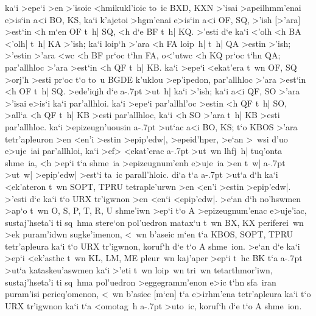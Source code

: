 \begin{Parallel}{}{}
{{ka`i >epe`i >en >'isoic <hmikukl'ioic to~ic BXD, KXN >'isai >apeilhmm'enai e>is`in a<i BO, KS,
ka`i k'ajetoi >hgm'enai e>is`in a<i OF, SQ, >'ish [>'ara] >est`in <h m`en OF t~h| SQ, <h d`e BF
t~h| KQ. >'esti d`e ka`i <'olh <h BA <'olh| t~h| KA >'ish; ka`i loip`h >'ara <h FA loip~h| t~h| QA >estin
>'ish; >'estin >'ara <wc <h BF pr`oc t`hn FA, o<'utwc <h KQ pr`oc t`hn QA; par'allhloc >'ara >est`in <h QF t~h| KB. ka`i
>epe`i <ekat'era t~wn OF, SQ >orj'h >esti pr`oc t`o to~u BGDE k'uklou >ep'ipedon, par'allhloc >'ara >est`in <h OF t~h| SQ. >ede'iqjh
d`e a\kern -.7pt >ut~h| ka`i >'ish; ka`i a<i QF, SO >'ara >'isai e>is`i ka`i par'allhloi. ka`i >epe`i par'allhl'oc >estin <h QF t~h|
SO, >all`a <h QF t~h| KB >esti par'allhloc, ka`i <h SO >'ara t~h| KB >esti par'allhloc. ka`i >epizeugn'uousin
a\kern -.7pt >ut`ac a<i BO, KS; t`o KBOS >'ara tetr'apleuron >en <en'i >estin >epip'edw|, >epeid'hper, >e`an >~wsi d'uo
e>uje~iai par'allhloi, ka`i >ef> <ekat'erac a\kern -.7pt >ut~wn lhfj~h| tuq'onta shme~ia, <h >ep`i t`a shme~ia >epizeugnum'enh
e>uje~ia >en t~w| a\kern -.7pt >ut~w| >epip'edw| >est`i ta~ic parall'hloic. di`a t`a a\kern -.7pt >ut`a d`h ka`i <ek'ateron t~wn SOPT, TPRU
tetraple'urwn >en <en'i >estin >epip'edw|. >'esti d`e ka`i t`o URX tr'igwnon >en <en`i <epip'edw|.
>e`an d`h no'hswmen >ap`o t~wn O, S, P, T, R, U shme'iwn >ep`i t`o A
>epizeugnum'enac e>uje'iac, sustaj'hseta'i ti sq~hma stere`on pol'uedron matax`u t~wn BX, KX periferei~wn >ek puram'idwn
sugke'imenon, <~wn b'aseic m`en t`a KBOS, SOPT, TPRU tetr'apleura ka`i t`o URX tr'igwnon, koruf`h d`e t`o A shme~ion. >e`an
d`e ka`i >ep`i <ek'asthc t~wn KL, LM, ME pleur~wn kaj'aper >ep`i t~hc BK t`a a\kern -.7pt >ut`a kataskeu'aswmen ka`i
>'eti t~wn loip~wn tri~wn tetarthmor'iwn, sustaj'hseta'i ti sq~hma pol'uedron >eggegramm'enon e>ic t`hn sfa~iran
puram'isi perieq'omenon, <~wn b'asiec [m`en] t`a e>irhm'ena tetr'apleura ka`i t`o URX tr'igwnon ka`i t`a <omotag~h
a\kern -.7pt >uto~ic, koruf`h d`e t`o A shme~ion.}


}
\end{Parallel}
